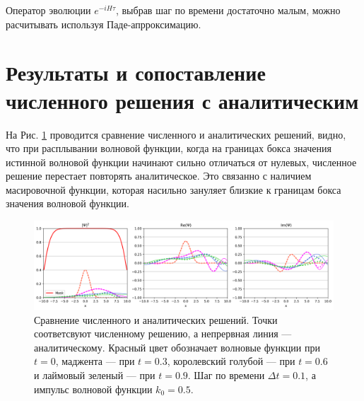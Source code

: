 \documentclass[10pt]{article}
\begin{document}
Оператор эволюции $e^{-i H \tau}$, выбрав шаг по времени достаточно малым, можно расчитывать используя Паде-апрроксимацию.

\section{Результаты и сопоставление численного решения с аналитическим}

На Рис. \ref{fig:1} проводится сравнение численного и аналитических решений, видно, что при расплывании волновой функции, когда на границах бокса значения истинной волновой функции начинают сильно отличаться от нулевых, численное решение перестает повторять аналитическое. Это связанно с наличием масировочной функции, которая насильно зануляет близкие к границам бокса значения волновой функции.

\begin{figure}[htbp]
 \centering
 \includegraphics[width=\textwidth]{../figures/comparison.png}
 \caption{Сравнение численного и аналитических решений. Точки соответсвуют численному решению, а непрервная линия --- аналитическому. Красный цвет обозначает волновые функции при $t=0$, маджента --- при $t=0.3$, королевский голубой --- при $t=0.6$ и лаймовый зеленый --- при $t=0.9$. Шаг по времени $\Delta t = 0.1$, а импульс волновой функции $k_0 = 0.5$.}
 \label{fig:1}
\end{figure}
\end{document}

